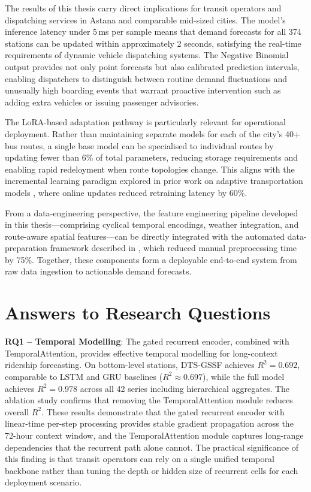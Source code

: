 The results of this thesis carry direct implications for transit operators and dispatching services in Astana and comparable mid-sized cities. The model's inference latency under 5\,ms per sample means that demand forecasts for all 374 stations can be updated within approximately 2 seconds, satisfying the real-time requirements of dynamic vehicle dispatching systems. The Negative Binomial output provides not only point forecasts but also calibrated prediction intervals, enabling dispatchers to distinguish between routine demand fluctuations and unusually high boarding events that warrant proactive intervention such as adding extra vehicles or issuing passenger advisories.

The LoRA-based adaptation pathway is particularly relevant for operational deployment. Rather than maintaining separate models for each of the city's 40+ bus routes, a single base model can be specialised to individual routes by updating fewer than 6\% of total parameters, reducing storage requirements and enabling rapid redeloyment when route topologies change. This aligns with the incremental learning paradigm explored in prior work on adaptive transportation models \cite{mektepbayeva2025adaptive}, where online updates reduced retraining latency by 60\%.

From a data-engineering perspective, the feature engineering pipeline developed in this thesis---comprising cyclical temporal encodings, weather integration, and route-aware spatial features---can be directly integrated with the automated data-preparation framework described in \cite{yedilkhan2025intelligent}, which reduced manual preprocessing time by 75\%. Together, these components form a deployable end-to-end system from raw data ingestion to actionable demand forecasts.

\section{Answers to Research Questions}
\label{sec:rq_answers}

\textbf{RQ1 -- Temporal Modelling}: The gated recurrent encoder, combined with TemporalAttention, provides effective temporal modelling for long-context ridership forecasting. On bottom-level stations, DTS-GSSF achieves $R^2 = 0.692$, comparable to LSTM and GRU baselines ($R^2 \approx 0.697$), while the full model achieves $R^2 = 0.978$ across all 42 series including hierarchical aggregates. The ablation study confirms that removing the TemporalAttention module reduces overall $R^2$. These results demonstrate that the gated recurrent encoder with linear-time per-step processing provides stable gradient propagation across the 72-hour context window, and the TemporalAttention module captures long-range dependencies that the recurrent path alone cannot. The practical significance of this finding is that transit operators can rely on a single unified temporal backbone rather than tuning the depth or hidden size of recurrent cells for each deployment scenario.

